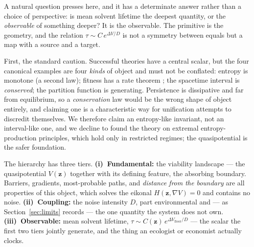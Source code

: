 \documentclass[11pt]{article}
\theoremstyle{plain}
\theoremstyle{definition}
\begin{document}
A natural question presses here, and it has a determinate answer rather than a choice of perspective: is mean solvent lifetime the deepest quantity, or the \emph{observable} of something deeper? It is the observable. The primitive is the geometry, and the relation $\tau \sim C\,e^{\Delta V/D}$ is not a symmetry between equals but a map with a source and a target.

First, the standard caution. Successful theories have a central scalar, but the four canonical examples are four \emph{kinds} of object and must not be conflated: entropy is monotone (a second law); fitness has a rate theorem \cite{fisher1930,price1972}; the spacetime interval is \emph{conserved}; the partition function is generating. Persistence is dissipative and far from equilibrium, so a \emph{conservation} law would be the wrong shape of object entirely, and claiming one is a characteristic way for unification attempts to discredit themselves. We therefore claim an entropy-like invariant, not an interval-like one, and we decline to found the theory on extremal entropy-production principles, which hold only in restricted regimes; the quasipotential is the safer foundation.

The hierarchy has three tiers. \textbf{(i)~Fundamental:} the viability landscape --- the quasipotential $V(\mathbf z)$ together with its defining feature, the absorbing boundary. Barriers, gradients, most-probable paths, and \emph{distance from the boundary} are all properties of this object, which solves the eikonal $H(\mathbf z,\nabla V)=0$ and contains no noise. \textbf{(ii)~Coupling:} the noise intensity $D$, part environmental and --- as Section~\ref{sec:limits} records --- the one quantity the system does not own. \textbf{(iii)~Observable:} mean solvent lifetime, $\tau \sim C(\mathbf z)\,e^{\Delta V_{\text{floor}}/D}$ --- the scalar the first two tiers jointly generate, and the thing an ecologist or economist actually clocks.
\end{document}
